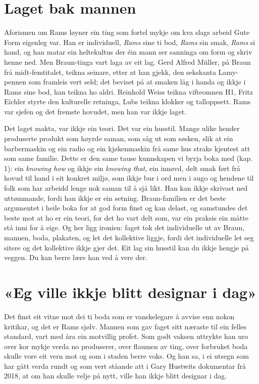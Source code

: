 \section{Laget bak mannen}

Aforismen om Rams løyner ein ting som fortel mykje om kva slags arbeid Gute Form eigenleg var. Han er individuell, \textit{Rams} sine ti bod, \textit{Rams} sin smak, \textit{Rams} si hand, og han matar ein heltekultus der éin mann ser sanninga om form og skriv henne ned. Men Braun-tinga vart laga av eit lag. Gerd Alfred Müller, på Braun frå midt-femtitalet, teikna seinare, etter at han gjekk, den sekskanta Lamy-pennen som framleis vert seld; det beviset på at smaken låg i handa og ikkje i Rams sine bod, han teikna ho aldri. Reinhold Weiss teikna vifteomnen H1, Fritz Eichler styrte den kulturelle retninga, Lubs teikna klokker og talloppsett. Rams var sjefen og det fremste hovudet, men han var ikkje laget.

Det laget makta, var ikkje ein teori. Det var ein husstil. Mange ulike hender produserte produkt som høyrde saman, som såg ut som søsken, slik at ein barbermaskin og ein radio og ein kjøkenmaskin frå same hus straks kjentest att som same familie. Dette er den same tause kunnskapen vi byrja boka med (kap. 1): ein \textit{knowing how} og ikkje ein \textit{knowing that}, ein innøvd, delt smak ført frå hovud til hand i eit konkret miljø, som ikkje bur i ord men i augo og hendene til folk som har arbeidd lenge nok saman til å sjå likt. Han kan ikkje skrivast ned uttømmande, fordi han ikkje er ein setning. Braun-familien er det beste argumentet i heile boka for at god form finst og kan delast, og samstundes det beste mot at ho er ein teori, for det ho vart delt som, var ein praksis ein måtte stå inni for å eige. Og her ligg ironien: faget tok det individuelle ut av Braun, mannen, boda, plakaten, og let det kollektive liggje, fordi det individuelle let seg sitere og det kollektive ikkje gjer det. Eit lag sin husstil kan du ikkje hengje på veggen. Du kan berre lære han ved å vere der.

\section{«Eg ville ikkje blitt designar i dag»}

Det finst eit vitne mot dei ti boda som er vanskelegare å avvise enn nokon kritikar, og det er Rams sjølv. Mannen som gav faget sitt næraste til ein felles standard, vart med åra ein motvillig profet. Som godt vaksen uttrykte han uro over kor mykje verda no produserer, over flaumen av ting, over forbruket boda skulle vore eit vern mot og som i staden berre voks. Og han sa, i ei utsegn som har gått verda rundt og som vert ståande att i Gary Hustwits dokumentar frå 2018, at om han skulle velje på nytt, ville han ikkje blitt designar i dag.

